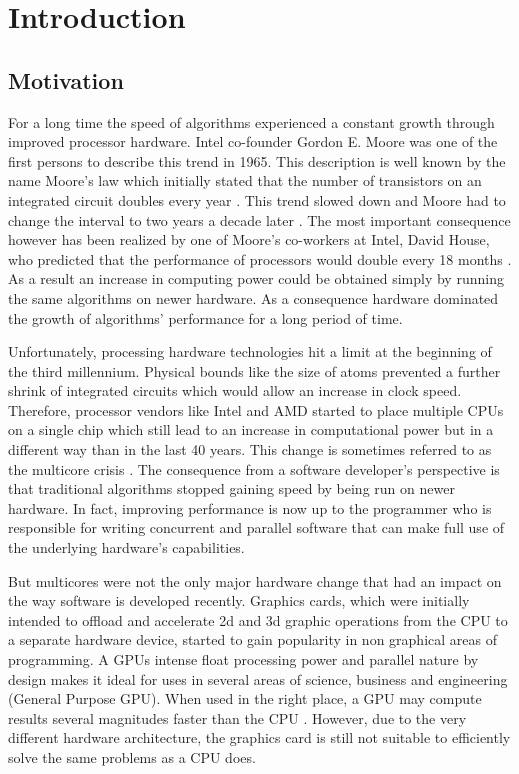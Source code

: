 \section{Introduction}

\subsection{Motivation}

For a long time the speed of algorithms experienced a constant growth through improved processor hardware. Intel co-founder Gordon E. Moore was one of the first persons to describe this trend in 1965. This description is well known by the name Moore's law which initially stated that the number of transistors on an integrated circuit doubles every year \cite{moore_law}. This trend slowed down and Moore had to change the interval to two years a decade later \cite{moore_law_2003}. The most important consequence however has been realized by one of Moore's co-workers at Intel, David House, who predicted that the performance of processors would double every 18 months \cite{moore_law_2003}. As a result an increase in computing power could be obtained simply by running the same algorithms on newer hardware. As a consequence hardware dominated the growth of algorithms' performance for a long period of time.

Unfortunately, processing hardware technologies hit a limit at the beginning of the third millennium. Physical bounds like the size of atoms prevented a further shrink of integrated circuits which would allow an increase in clock speed. Therefore, processor vendors like Intel and AMD started to place multiple CPUs on a single chip which still lead to an increase in computational power but in a different way than in the last 40 years. This change is sometimes referred to as the multicore crisis \cite{multicore_crisis}. The consequence from a software developer's perspective is that traditional algorithms stopped gaining speed by being run on newer hardware. In fact, improving performance is now up to the programmer who is responsible for writing concurrent and parallel software that can make full use of the underlying hardware's capabilities. 

But multicores were not the only major hardware change that had an impact on the way software is developed recently. Graphics cards, which were initially intended to offload and accelerate 2d and 3d graphic operations from the CPU to a separate hardware device, started to gain popularity in non graphical areas of programming. A GPUs intense float processing power and parallel nature by design makes it ideal for uses in several areas of science, business and engineering (General Purpose GPU). When used in the right place, a GPU may compute results several magnitudes faster than the CPU \cite{gpu_history}. However, due to the very different hardware architecture, the graphics card is still not suitable to efficiently solve the same problems as a CPU does.

